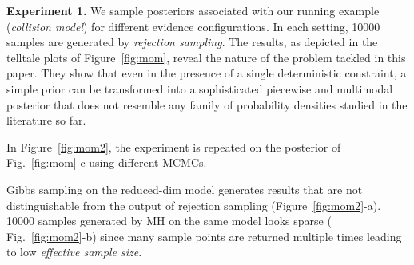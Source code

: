 \documentclass{article}
\begin{document}

\textbf{Experiment 1.} We sample posteriors associated with our running example (\emph{collision model}) for different evidence configurations.
In each setting, 10000 samples are generated by \emph{rejection sampling}.
The results, as depicted in the telltale plots of Figure~\ref{fig:mom}, reveal the nature of the problem tackled in this paper.
They show that even in the presence of a single deterministic constraint, 
a simple prior can be transformed into a sophisticated piecewise and multimodal posterior that does not resemble any family of 
probability densities studied in the literature so far. 

In Figure~\ref{fig:mom2}, the experiment is repeated on the posterior of 
Fig.~\ref{fig:mom}-c using different MCMCs.%

 
Gibbs sampling on the {\color{green} reduced-dim} model generates results that are not distinguishable from the output of rejection sampling
(Figure~\ref{fig:mom2}-a).
10000 samples generated by MH on the same model looks sparse ( Fig.~\ref{fig:mom2}-b) since many sample points are returned multiple times leading to low \emph{effective sample size}.
\end{document}
